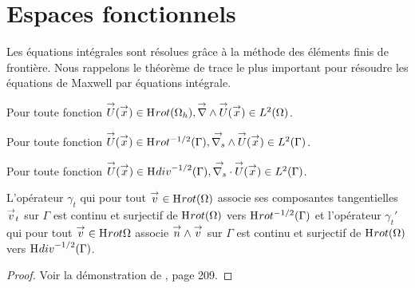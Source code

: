 \section{Espaces fonctionnels}
  Les équations intégrales sont résolues grâce à la méthode des éléments finis de frontière. Nous rappelons le théorème de trace le plus important pour résoudre les équations de Maxwell par équations intégrale.

  \begin{defn}
    Pour toute fonction \(\vect{U}(\vx) \in \Hrot(\OO_h), \vrot \vect{U}(\vx) \in L^2(\OO)\).

    Pour toute fonction \(\vect{U}(\vx) \in \Hrot^{-1/2}(\Gamma), \vrots \vect{U}(\vx) \in L^2(\Gamma)\).

    Pour toute fonction \(\vect{U}(\vx) \in \Hdiv^{-1/2}(\Gamma), \vdivs \vect{U}(\vx) \in L^2(\Gamma)\).
  \end{defn}
  \begin{thm}
    L'opérateur \(\gamma_t\) qui pour tout  \(\vect{v}\in\Hrot(\OO)\) associe ses composantes tangentielles \(\vect{v}_t\) sur \(\Gamma\) est continu et surjectif de \(\Hrot(\OO)\) vers \(\Hrot^{-1/2}(\Gamma)\) et l'opérateur \(\gamma_t'\) qui pour tout  \(\vect{v}\in\Hrot{\OO}\) associe \(\vn \pvect \vect{v}\) sur \(\Gamma\) est continu et surjectif de \(\Hrot(\OO)\) vers \(\Hdiv^{-1/2}(\Gamma)\).
  \end{thm}
  \begin{proof}
    Voir la démonstration de \cite[Théorème~5.4.2]{nedelec_acoustic_2001}, page 209.
  \end{proof}